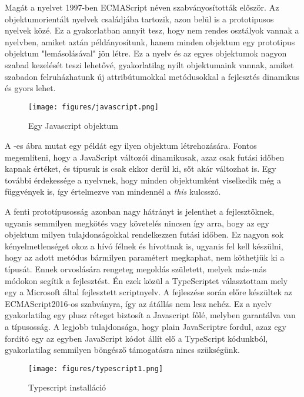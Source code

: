 Magát a nyelvet 1997-ben ECMAScript néven szabványosították először. Az objektumorientált nyelvek családjába tartozik, azon belül is a prototipusos nyelvek közé. Ez a gyakorlatban annyit tesz, hogy nem rendes osztályok vannak a nyelvben, amiket aztán példányosítunk, hanem minden objektum egy prototipus objektum "lemásolásával" jön létre. Ez a nyelv és az egyes objektumok nagyon szabad kezelését teszi lehetővé, gyakorlatilag nyílt objektumaink vannak, amiket szabadon felruházhatunk új attribútumokkal metódusokkal a fejlesztés dinamikus és gyors lehet.

\begin{figure}[!ht]
\centering
\texttt{[image: figures/javascript.png]}
\caption{Egy Javascript objektum} 
\label{fig:JS}
\end{figure} 

A -es ábra mutat egy példát egy ilyen objektum létrehozására. Fontos megemlíteni, hogy a JavaScript változói dinamikusak, azaz csak futási időben kapnak értéket, és típusuk is csak ekkor derül ki, sőt akár változhat is. Egy további érdekessége a nyelvnek, hogy minden objektumként viselkedik még a függvények is, így értelmezve van mindennél a \textit{this} kulcsszó.

A fenti prototípusosság azonban nagy hátrányt is jelenthet a fejlesztőknek, ugyanis semmilyen megkötés vagy követelés nincsen így arra, hogy az egy objektum milyen tulajdonságokkal rendelkezzen futási időben. Ez nagyon sok kényelmetlenséget okoz a hívó félnek és hívottnak is, ugyanis fel kell készülni, hogy az adott metódus bármilyen paramétert megkaphat, nem köthetjük ki a típusát. Ennek orvoslására rengeteg megoldás született, melyek más-más módokon segítik a fejlesztést. Én ezek közül a TypeScriptet választottam mely egy a Microsoft által fejlesztett scriptnyelv. \cite{Typescript}
A fejleszése során előre készültek az ECMAScript2016-os szabványra, így az átállás nem lesz nehéz. Ez a nyelv gyakorlatilag egy plusz réteget biztosít a Javascript főlé, melyben garantálva van a típusosság. A legjobb tulajdonsága, hogy plain JavaScriptre fordul, azaz egy fordító egy az egyben JavaScript kódot állít elő a TypeScript kódunkból, gyakorlatilag semmilyen böngésző támogatásra nincs szükségünk. 

\begin{figure}[!ht]
\centering
\texttt{[image: figures/typescript1.png]}
\caption{Typescript installáció} 
\label{fig:TS1}
\end{figure} 

